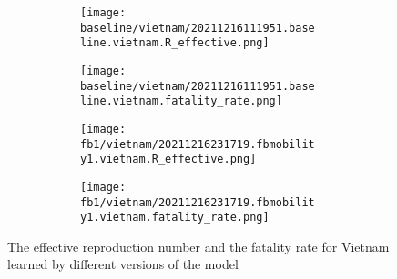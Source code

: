 \begin{figure}[!htb]
    \centering

    \begin{subfigure}[b]{\linewidth}
        \centering
        \begin{subfigure}[b]{0.4\linewidth}
            \texttt{[image: baseline/vietnam/20211216111951.baseline.vietnam.R\_effective.png]}
        \end{subfigure}
        \begin{subfigure}[b]{0.4\linewidth}
            \texttt{[image: baseline/vietnam/20211216111951.baseline.vietnam.fatality\_rate.png]}
        \end{subfigure}
    \end{subfigure}

    \begin{subfigure}[b]{\linewidth}
        \centering
        \begin{subfigure}[b]{0.4\linewidth}
            \texttt{[image: fb1/vietnam/20211216231719.fbmobility1.vietnam.R\_effective.png]}
        \end{subfigure}
        \begin{subfigure}[b]{0.4\linewidth}
            \texttt{[image: fb1/vietnam/20211216231719.fbmobility1.vietnam.fatality\_rate.png]}
        \end{subfigure}
    \end{subfigure}

    \caption{The effective reproduction number and the fatality rate for Vietnam learned by different versions of the model}
    \label{fig:R0-and-fatality-vietnam}
\end{figure}

